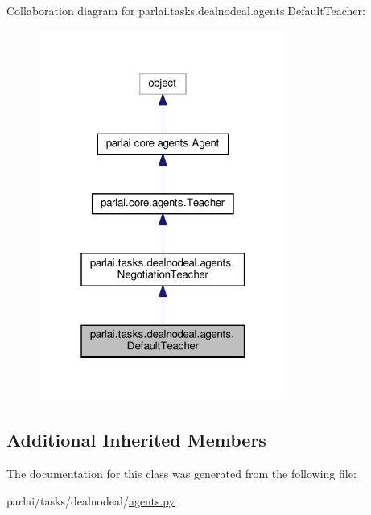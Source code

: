 Collaboration diagram for parlai.\+tasks.\+dealnodeal.\+agents.\+Default\+Teacher\+:
\nopagebreak
\begin{figure}[H]
\begin{center}
\leavevmode
\includegraphics[width=232pt]{classparlai_1_1tasks_1_1dealnodeal_1_1agents_1_1DefaultTeacher__coll__graph}
\end{center}
\end{figure}
\subsection*{Additional Inherited Members}


The documentation for this class was generated from the following file\+:\begin{DoxyCompactItemize}
\item 
parlai/tasks/dealnodeal/\hyperlink{parlai_2tasks_2dealnodeal_2agents_8py}{agents.\+py}\end{DoxyCompactItemize}
